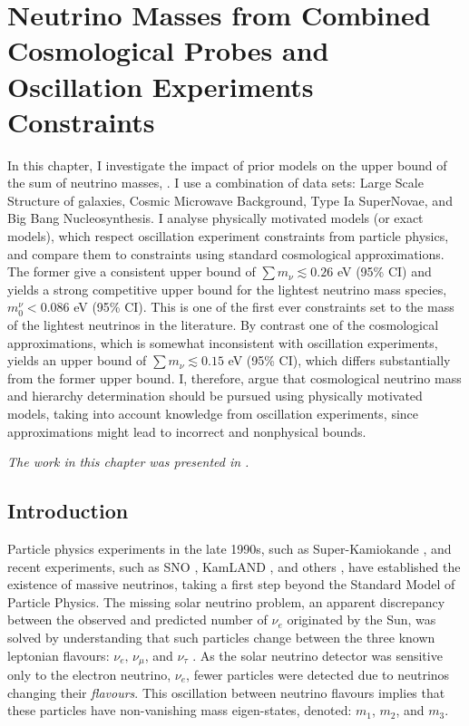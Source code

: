 %
\chapter{Neutrino Masses from Combined Cosmological Probes and Oscillation Experiments Constraints}
\label{Chap:Neutrinos}


\vspace*{\fill}

In this chapter, I investigate the impact of prior models on the upper bound of the sum of neutrino masses, \NM{}. I use a combination of data sets: Large Scale Structure of galaxies, Cosmic Microwave Background, Type Ia SuperNovae, and Big Bang Nucleosynthesis. I analyse physically motivated models (or exact models), which respect oscillation experiment constraints from particle physics, and compare them to constraints using standard cosmological approximations. The former give a consistent upper bound of $\sum m_{\nu} \lesssim 0.26$ eV (95\% CI) and yields a strong competitive upper bound for the lightest neutrino mass species, $m_0^{\nu} < 0.086$ eV (95\% CI). This is one of the first ever constraints set to the mass of the lightest neutrinos in the literature. By contrast one of the cosmological approximations, which is somewhat inconsistent with oscillation experiments, yields an upper bound of $\sum m_{\nu} \lesssim 0.15$ eV (95\% CI), which differs substantially from the former upper bound. I, therefore, argue that cosmological neutrino mass and hierarchy determination should be pursued using physically motivated models, taking into account knowledge from oscillation experiments, since approximations might lead to incorrect and nonphysical bounds.

\textit{The work in this chapter was presented in \citet{2018LoureiroNeutrinos}.} 

\newpage
\section{Introduction}
Particle physics experiments in the late 1990s, such as Super-Kamiokande \citep{Kamiokande1998}, and recent experiments, such as SNO \citep{2002SNO}, KamLAND \citep{2005KamLAND}, and others \citep{2008MINOS,2012RENOExperiment,AbeNeutrino2014}, have established the existence of massive neutrinos, taking a first step beyond the Standard Model of Particle Physics. The missing solar neutrino problem, an apparent discrepancy between the observed and predicted number of $\nu_e$ originated by the Sun, was solved by understanding that such particles change between the three known leptonian flavours: $\nu_e, \, \nu_{\mu}$, and $\nu_{\tau}$ \citep{2016Capozzi}. As the solar neutrino detector was sensitive only to the electron neutrino, $\nu_e$, fewer particles were detected due to neutrinos changing their \textit{flavours}. This oscillation between neutrino flavours implies that these particles have non-vanishing mass eigen-states, denoted: $m_1$, $m_2$, and $m_3$. 

